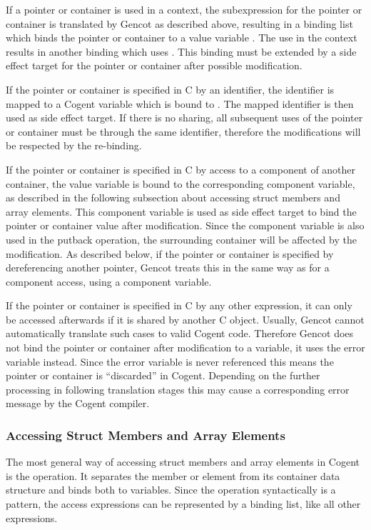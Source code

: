 If a pointer or container is used in a context, the subexpression for the pointer or container is translated by Gencot as 
described above, resulting in a binding list which binds the pointer or container to a value
variable . The use in the context results in another binding which uses .
This binding must be extended by a side effect target for the pointer or container after possible modification. 

If the pointer or container is specified in C by an identifier, the identifier is mapped to a Cogent variable 
which is bound to . The mapped identifier is then used as side effect target. If there is no sharing, all
subsequent uses of the pointer or container must be through the same identifier, therefore the modifications will be
respected by the re-binding.

If the pointer or container is specified in C by access to a component of another container, the value variable 
 is bound to the corresponding component variable, as described in the following subsection about 
accessing struct members and array elements. This component variable is used as side effect target to bind the pointer
or container value after modification. Since the component variable is also used in the putback operation, the surrounding
container will be affected by the modification. As described below, if the pointer or container is specified by dereferencing
another pointer, Gencot treats this in the same way as for a component access, using a component variable.

If the pointer or container is specified in C by any other expression, it can only be accessed afterwards if it is shared 
by another C object. Usually, Gencot cannot automatically translate such cases to valid Cogent code. Therefore Gencot 
does not bind the pointer or container after modification to a variable, it uses the error variable  instead. Since
the error variable is never referenced this
means the pointer or container is ``discarded'' in Cogent. Depending on the further processing in following translation 
stages this may cause a corresponding error message by the Cogent compiler.

\subsubsection{Accessing Struct Members and Array Elements}

The most general way of accessing struct members and array elements in Cogent is the  operation. It separates
the member or element from its container data structure and binds both to variables. Since the  operation 
syntactically is a pattern, the access expressions can be represented by a binding list, like all other expressions.

